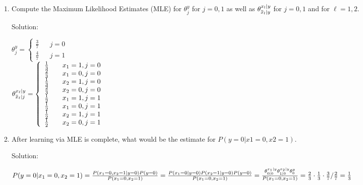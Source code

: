 \documentclass[12pt]{article}
\newcommand{\solu}{{\color{blue} Solution:}}
\newcommand{\overbar}[1]{\mkern 1.5mu\overline{\mkern-1.5mu#1\mkern-1.5mu}\mkern 1.5mu}
\begin{document}
\begin{enumerate}
        \begin{enumerate}
            \item Compute the Maximum Likelihood Estimates (MLE) for $\theta^y_j$ for $j = 0, 1$ as well as $\theta^{{x_l}|y}_{{\overbar{x}_l}|y}$ for $j = 0,1$ and for $\ell=1,2$.
            
            \solu 
        
            $\theta^y_j = \left\{
                \begin{array}{rcl}
                    \frac{3}{7} & & j = 0\\
                    \frac{4}{7} & & j = 1
                \end{array}
            \right.$\\
            $\theta^{x_\ell | y}_{\overbar{x}_\ell | j} = \left\{
                \begin{array}{rcl}
                    \frac{1}{3} & & x_1 = 1, j = 0\\
                    \frac{2}{3} & & x_1 = 0, j = 0\\
                    \frac{1}{3} & & x_2 = 1, j = 0\\
                    \frac{2}{3} & & x_2 = 0, j = 0\\
                    \frac{1}{2} & & x_1 = 1, j = 1\\
                    \frac{1}{2} & & x_1 = 0, j = 1\\
                    \frac{1}{2} & & x_2 = 1, j = 1\\
                    \frac{1}{2} & & x_2 = 0, j = 1
                \end{array}
            \right.$

            \item After learning via MLE is complete, what would be the estimate for $P (y = 0|x1 = 0, x2 = 1)$.
            
            \solu 
            
            $P(y = 0 | x_1 = 0, x_2 = 1)\\
            = \frac{P(x_1 = 0, x_2 = 1 | y = 0)P(y = 0)}{P(x_1 = 0, x_2 = 1)}\\
            = \frac{P(x_1 = 0| y = 0)P(x_2 = 1| y = 0)P(y = 0)}{P(x_1 = 0, x_2 = 1)}\\
            = \frac{\theta^{x_1 | y}_{0 | 0}\theta^{x_2 | y}_{1 | 0}\theta^y_0}{P(x_1 = 0, x_2 = 1)}\\
            = \frac{2}{3} \cdot \frac{1}{3} \cdot \frac{3}{7}  / \frac{2}{7}\\
            = \frac{1}{3}$


\end{enumerate}
\end{enumerate}
\end{document}
